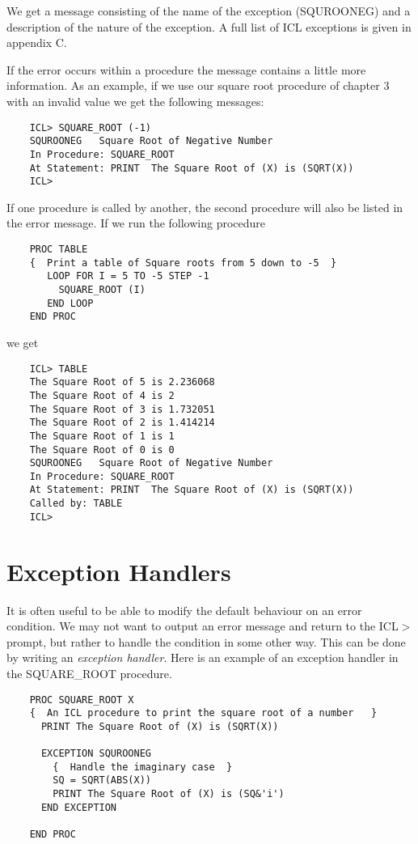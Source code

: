 We get a message consisting of the name of the exception (SQUROONEG) and
a description of the nature of the exception. A full list of ICL
exceptions is given in appendix C.

If the error occurs within a procedure the message contains a little
more information. As an example, if we use our square root procedure of
chapter 3 with an invalid value we get the following messages:
\begin{verbatim}
    ICL> SQUARE_ROOT (-1)
    SQUROONEG   Square Root of Negative Number
    In Procedure: SQUARE_ROOT
    At Statement: PRINT  The Square Root of (X) is (SQRT(X))
    ICL>
\end{verbatim}

If one procedure is called by another, the second procedure will also
be listed in the error message. If we run the following procedure

\begin{verbatim}
    PROC TABLE
    {  Print a table of Square roots from 5 down to -5  }
       LOOP FOR I = 5 TO -5 STEP -1
         SQUARE_ROOT (I)
       END LOOP
    END PROC
\end{verbatim}

we get

\begin{verbatim}
    ICL> TABLE
    The Square Root of 5 is 2.236068
    The Square Root of 4 is 2
    The Square Root of 3 is 1.732051
    The Square Root of 2 is 1.414214
    The Square Root of 1 is 1
    The Square Root of 0 is 0
    SQUROONEG   Square Root of Negative Number
    In Procedure: SQUARE_ROOT
    At Statement: PRINT  The Square Root of (X) is (SQRT(X))
    Called by: TABLE
    ICL>
\end{verbatim}

\section{Exception Handlers}

It is often useful to be able to modify the default behaviour on an
error condition. We may not want to output an error message and return
to the ICL$>$ prompt, but rather to handle the condition in some other way.
This can be done by writing an {\em exception handler}. Here is an
example of an exception handler in the SQUARE\_ROOT procedure.

\begin{verbatim}
    PROC SQUARE_ROOT X
    {  An ICL procedure to print the square root of a number   }
      PRINT The Square Root of (X) is (SQRT(X))

      EXCEPTION SQUROONEG
        {  Handle the imaginary case  }
        SQ = SQRT(ABS(X))
        PRINT The Square Root of (X) is (SQ&'i')
      END EXCEPTION

    END PROC
\end{verbatim}

